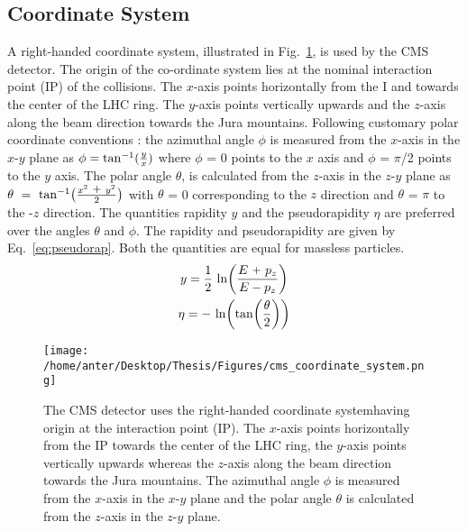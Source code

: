\subsection{Coordinate System}
A right-handed coordinate system, illustrated in Fig.~\ref{fig:coordinate}, is used by the CMS detector. The origin of the co-ordinate system lies at the nominal interaction point (IP) of the collisions. The $x$-axis points horizontally from the I and towards the center of the LHC ring. The $y$-axis points vertically upwards and the $z$-axis along the beam direction towards the Jura mountains. %
Following customary polar coordinate conventions : the azimuthal angle $\phi$ is measured from the $x$-axis in the $x$-$y$ plane as $\phi = {\rm tan^{-1}}(\frac{y}{x})$ where $\phi$ = 0 points to the \plusn $x$ axis and $\phi$ = $\pi$/2 points to the \plusn $y$ axis. The polar angle $\theta$, is calculated from the $z$-axis in the $z$-$y$ plane as $\theta~=~{\rm tan^{-1}}\big(\frac{x^2~\plus y^2}{2}\big)$ with $\theta$ = 0 corresponding to the \plusn $z$ direction and $\theta$ = $\pi$ to the -$z$ direction. The quantities rapidity $y$ and the pseudorapidity $\eta$ are preferred over the angles $\theta$ and $\phi$. The rapidity and pseudorapidity are given by Eq.~\ref{eq:pseudorap}. Both the quantities are equal for massless particles.
\begin{equation}
\begin{gathered}
y = \frac{1}{2}~{\rm ln} \bigg(\frac{E~\plus p_z}{E - p_z} \bigg) \\
\eta = -~{\rm ln}\bigg({\rm tan}\bigg(\frac{\theta}{2}\bigg)\bigg)
\end{gathered}
\label{eq:pseudorap}
\end{equation}
\begin{figure}[!h]
\begin{center} 
\hspace*{-15mm}
\texttt{[image: /home/anter/Desktop/Thesis/Figures/cms\_coordinate\_system.png]}
\vspace{3mm}
\caption[The right-handed coordinate system used by the CMS detector.]{The CMS detector uses the right-handed coordinate system\footnotemark having origin at the interaction point (IP). The $x$-axis points horizontally from the IP towards the center of the LHC ring, the $y$-axis points vertically upwards whereas the $z$-axis along the beam direction towards the Jura mountains. The azimuthal angle $\phi$ is measured from the $x$-axis in the $x$-$y$ plane and the polar angle $\theta$ is calculated from the $z$-axis in the $z$-$y$ plane.}
\label{fig:coordinate}
\end{center}
\end{figure}

